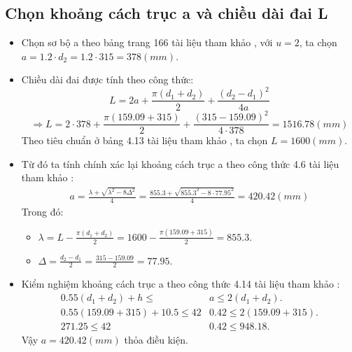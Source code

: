         \subsection{Chọn khoảng cách trục a và chiều dài đai L}
            \begin{itemize}
                \item Chọn sơ bộ a theo bảng trang 166 tài liệu tham khảo \cite{gtctm}, với $u = 2$, ta chọn $a = 1.2 \cdot d_2 = 1.2 \cdot 315 = 378(mm)$.
                \item Chiều dài đai được tính theo công thức:
                    \begin{equation}
                        L = 2a + \frac{\pi(d_1 + d_2)}{2} + \frac{(d_2 - d_1)^2}{4a} 
                    \end{equation}
                    $$\Rightarrow L = 2 \cdot 378 + \frac{\pi(159.09 + 315)}{2} + \frac{(315 - 159.09)^2}{4 \cdot 378} = 1516.78(mm)$$
                    Theo tiêu chuẩn ở bảng 4.13 tài liệu tham khảo \cite{tltk1}, ta chọn $L = 1600 (mm)$.\\
                \item Từ đó ta tính chính xác lại khoảng cách trục a theo công thức 4.6 tài liệu tham khảo \cite{tltk1}:
                    \begin{align}
                        a = \frac{\lambda + \sqrt{\lambda^2 - 8\Delta^2}}{4} = \frac{855.3 + \sqrt{855.3^2 - 8 \cdot 77.95^2}}{4} = 420.42(mm)
                    \end{align}
                    Trong đó:
                    \begin{itemize}
                        \item $\lambda = L - \frac{\pi(d_1 + d_2)}{2} = 1600 - \frac{\pi(159.09 + 315)}{2} = 855.3.$
                        \item $\Delta = \frac{d_2 - d_1}{2} = \frac{315 - 159.09}{2} = 77.95.$
                    \end{itemize}
                \item Kiểm nghiệm khoảng cách trục a theo công thức 4.14 tài liệu tham khảo \cite{tltk1}:
                    \begin{align*}
                        0.55(d_1 + d_2) + h \leq &a \leq 2(d_1 + d_2).\\
                        0.55(159.09 + 315) + 10.5 \leq 42&0.42 \leq 2(159.09 + 315).\\
                        271.25 \leq 42&0.42 \leq 948.18.   
                    \end{align*}
                    \hspace*{0.6cm}Vậy $a = 420.42(mm)$ thỏa điều kiện.
            \end{itemize}
